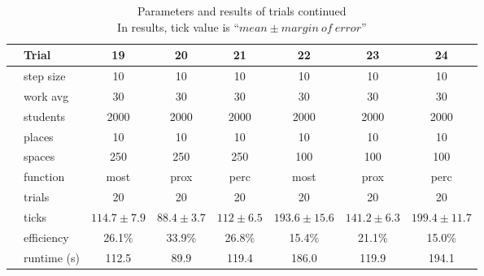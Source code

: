 \documentclass[11pt]{article} %
\begin{document}
\begin{table}[]
\footnotesize
\centering
\begin{tabular}{l|l|ccc|ccc}
 & Trial & 19 & 20 & 21 & 22 & 23 & 24  \\ \hline
  \parbox[t]{2mm}{} 
 & step size 	& 10  			& 10  			& 10 			& 10 					& 10 				& 10  \\
 & work avg 	& 30 			&  30 			& 30			& 30 					& 30 				& 30 \\
 & students 	& 2000 			& 2000 			& 2000 			& 2000 					& 2000 				& 2000 \\
 & places 		& 10 			& 10 			& 10 			& 10 					& 10 				& 10 \\
 & spaces 		& 250 			& 250 			& 250 			& 100 					& 100 				& 100 \\
 & function 	& most 			& prox 			& perc 			& most 					& prox 				& perc \\
 & trials 		& 20 			& 20 			& 20 			& 20 					& 20 				& 20 \\ \hline
\parbox[t]{2mm}{} 
 & ticks 		& $114.7\pm 7.9$ 	& $88.4\pm 3.7 $ 	& $ 112\pm 6.5 $	& $193.6\pm 15.6 $	& $141.2\pm 6.3 $	& $199.4\pm 11.7 $ \\
 & efficiency 	& 26.1\%			& 33.9\%		& 26.8\%			& 15.4\%			& 21.1\%			& 15.0\% \\
 & runtime (s) 	& 112.5			& 89.9			& 119.4			& 186.0			& 119.9			& 194.1
\end{tabular}
\caption{Parameters and results of trials continued \\ \footnotesize In results, tick value is ``$mean \pm margin \: of \: error$''}
\end{table}

\end{document}
